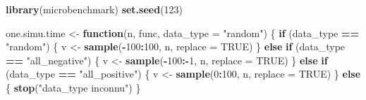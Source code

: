 \documentclass[
]{article}
\newenvironment{Shaded}{\begin{snugshade}}{\end{snugshade}}
\newcommand{\AttributeTok}[1]{\textcolor[rgb]{0.13,0.29,0.53}{#1}}
\newcommand{\ConstantTok}[1]{\textcolor[rgb]{0.56,0.35,0.01}{#1}}
\newcommand{\ControlFlowTok}[1]{\textcolor[rgb]{0.13,0.29,0.53}{\textbf{#1}}}
\newcommand{\DecValTok}[1]{\textcolor[rgb]{0.00,0.00,0.81}{#1}}
\newcommand{\FunctionTok}[1]{\textcolor[rgb]{0.13,0.29,0.53}{\textbf{#1}}}
\newcommand{\NormalTok}[1]{#1}
\newcommand{\OtherTok}[1]{\textcolor[rgb]{0.56,0.35,0.01}{#1}}
\newcommand{\SpecialCharTok}[1]{\textcolor[rgb]{0.81,0.36,0.00}{\textbf{#1}}}
\newcommand{\StringTok}[1]{\textcolor[rgb]{0.31,0.60,0.02}{#1}}
\begin{document}
\begin{Shaded}
\begin{Highlighting}[]
\FunctionTok{library}\NormalTok{(microbenchmark)}
\FunctionTok{set.seed}\NormalTok{(}\DecValTok{123}\NormalTok{)}

\NormalTok{one.simu.time }\OtherTok{\textless{}{-}} \ControlFlowTok{function}\NormalTok{(n, func, }\AttributeTok{data\_type =} \StringTok{"random"}\NormalTok{) \{}
  \ControlFlowTok{if}\NormalTok{ (data\_type }\SpecialCharTok{==} \StringTok{"random"}\NormalTok{) \{}
\NormalTok{    v }\OtherTok{\textless{}{-}} \FunctionTok{sample}\NormalTok{(}\SpecialCharTok{{-}}\DecValTok{100}\SpecialCharTok{:}\DecValTok{100}\NormalTok{, n, }\AttributeTok{replace =} \ConstantTok{TRUE}\NormalTok{)}
\NormalTok{  \} }\ControlFlowTok{else} \ControlFlowTok{if}\NormalTok{ (data\_type }\SpecialCharTok{==} \StringTok{"all\_negative"}\NormalTok{) \{}
\NormalTok{    v }\OtherTok{\textless{}{-}} \FunctionTok{sample}\NormalTok{(}\SpecialCharTok{{-}}\DecValTok{100}\SpecialCharTok{:{-}}\DecValTok{1}\NormalTok{, n, }\AttributeTok{replace =} \ConstantTok{TRUE}\NormalTok{)}
\NormalTok{  \} }\ControlFlowTok{else} \ControlFlowTok{if}\NormalTok{ (data\_type }\SpecialCharTok{==} \StringTok{"all\_positive"}\NormalTok{) \{}
\NormalTok{    v }\OtherTok{\textless{}{-}} \FunctionTok{sample}\NormalTok{(}\DecValTok{0}\SpecialCharTok{:}\DecValTok{100}\NormalTok{, n, }\AttributeTok{replace =} \ConstantTok{TRUE}\NormalTok{)}
\NormalTok{  \} }\ControlFlowTok{else}\NormalTok{ \{}
    \FunctionTok{stop}\NormalTok{(}\StringTok{"data\_type inconnu"}\NormalTok{)}
\NormalTok{  \}}


\end{Highlighting}
\end{Shaded}
\end{document}
